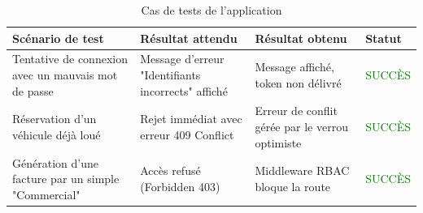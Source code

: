 \begin{table}[H]
    \centering
    \renewcommand{\arraystretch}{1.5}
    \begin{tabular}{|p{4cm}|p{4cm}|p{4cm}|p{2cm}|}
        \hline
        \cellcolor{gray!20}\textbf{Scénario de test} & \cellcolor{gray!20}\textbf{Résultat attendu} & \cellcolor{gray!20}\textbf{Résultat obtenu} & \cellcolor{gray!20}\textbf{Statut} \\
        \hline
        Tentative de connexion avec un mauvais mot de passe & Message d'erreur "Identifiants incorrects" affiché & Message affiché, token non délivré & \textcolor{green}{SUCCÈS} \\
        \hline
        Réservation d'un véhicule déjà loué & Rejet immédiat avec erreur 409 Conflict & Erreur de conflit gérée par le verrou optimiste & \textcolor{green}{SUCCÈS} \\
        \hline
        Génération d'une facture par un simple "Commercial" & Accès refusé (Forbidden 403) & Middleware RBAC bloque la route & \textcolor{green}{SUCCÈS} \\
        \hline
    \end{tabular}
    \caption{Cas de tests de l'application}
\end{table}
